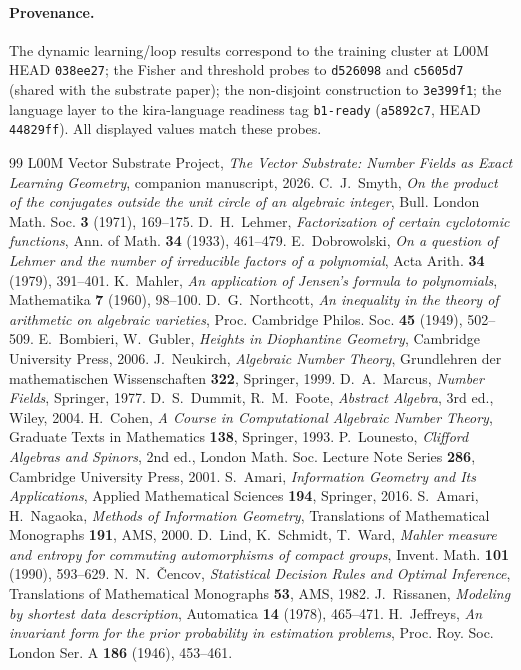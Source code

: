 \documentclass[11pt]{article}
\theoremstyle{plain}
\theoremstyle{definition}
\theoremstyle{remark}
\begin{document}
\paragraph{Provenance.} The dynamic learning/loop results correspond to the training cluster at L00M HEAD
\texttt{038ee27}; the Fisher and threshold probes to \texttt{d526098} and \texttt{c5605d7} (shared with the
substrate paper); the non-disjoint construction to \texttt{3e399f1}; the language layer to the kira-language
readiness tag \texttt{b1-ready} (\texttt{a5892c7}, HEAD \texttt{44829ff}). All displayed values match these
probes.

\begin{thebibliography}{99}
 L00M Vector Substrate Project, \emph{The Vector Substrate: Number Fields as Exact
  Learning Geometry}, companion manuscript, 2026.
 C.~J.~Smyth, \emph{On the product of the conjugates outside the unit circle of an algebraic
  integer}, Bull. London Math. Soc. \textbf{3} (1971), 169--175.
 D.~H.~Lehmer, \emph{Factorization of certain cyclotomic functions}, Ann. of Math.
  \textbf{34} (1933), 461--479.
 E.~Dobrowolski, \emph{On a question of Lehmer and the number of irreducible factors of
  a polynomial}, Acta Arith. \textbf{34} (1979), 391--401.
 K.~Mahler, \emph{An application of Jensen's formula to polynomials}, Mathematika
  \textbf{7} (1960), 98--100.
 D.~G.~Northcott, \emph{An inequality in the theory of arithmetic on algebraic varieties},
  Proc. Cambridge Philos. Soc. \textbf{45} (1949), 502--509.
 E.~Bombieri, W.~Gubler, \emph{Heights in Diophantine Geometry}, Cambridge
  University Press, 2006.
 J.~Neukirch, \emph{Algebraic Number Theory}, Grundlehren der mathematischen
  Wissenschaften \textbf{322}, Springer, 1999.
 D.~A.~Marcus, \emph{Number Fields}, Springer, 1977.
 D.~S.~Dummit, R.~M.~Foote, \emph{Abstract Algebra}, 3rd ed., Wiley, 2004.
 H.~Cohen, \emph{A Course in Computational Algebraic Number Theory}, Graduate Texts in
  Mathematics \textbf{138}, Springer, 1993.
 P.~Lounesto, \emph{Clifford Algebras and Spinors}, 2nd ed., London Math. Soc. Lecture
  Note Series \textbf{286}, Cambridge University Press, 2001.
 S.~Amari, \emph{Information Geometry and Its Applications}, Applied Mathematical Sciences
  \textbf{194}, Springer, 2016.
 S.~Amari, H.~Nagaoka, \emph{Methods of Information Geometry}, Translations of
  Mathematical Monographs \textbf{191}, AMS, 2000.
 D.~Lind, K.~Schmidt, T.~Ward, \emph{Mahler measure and entropy for commuting automorphisms of
  compact groups}, Invent. Math. \textbf{101} (1990), 593--629.
 N.~N.~\v{C}encov, \emph{Statistical Decision Rules and Optimal Inference}, Translations of
  Mathematical Monographs \textbf{53}, AMS, 1982.
 J.~Rissanen, \emph{Modeling by shortest data description}, Automatica \textbf{14}
  (1978), 465--471.
 H.~Jeffreys, \emph{An invariant form for the prior probability in estimation problems},
  Proc. Roy. Soc. London Ser. A \textbf{186} (1946), 453--461.
\end{thebibliography}
\end{document}
